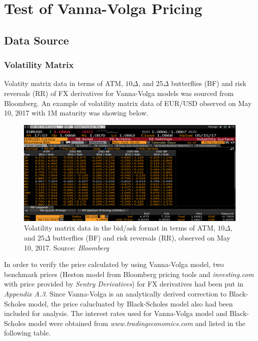 \chapter{Test of Vanna-Volga Pricing}


\section{Data Source}
\subsection{Volatility Matrix}
Volatity matrix data in terms of ATM, $10\Delta$, and 25$\Delta$ butterflies (BF) and risk reversals (RR) of FX derivatives for Vanna-Volga models was sourced from Bloomberg. An example of volatility matrix data of EUR/USD observed on May 10, 2017 with 1M maturity was showing below.

\begin{figure}[htb]
	\centering
	\includegraphics[scale=0.3]{./Testing-data/VolMatrix/EURUSD_1M_vol.png} 
	\caption{Volatility matrix data in the bid/ask format in terms of ATM, $10\Delta$, and $25\Delta$ butterflies (BF) and risk reversals (RR), observed on May 10, 2017. Source: \textit{Bloomberg}}
	\label{fig:label} %
\end{figure}
\noindent
In order to verify the price calculated by using Vanna-Volga model, two benchmark prices (Heston model from Bloomberg pricing tools and \textit{investing.com} with price provided by \textit{Sentry Derivatives}) for FX derivatives had been put in \textit{Appendix A.3}. Since Vanna-Volga is an analytically derived correction to Black-Scholes model, the price calucluated by Black-Scholes model also had been included for analysis.
\newline
\newline
The interest rates used for Vanna-Volga model and Black-Scholes model were obtained from \textit{www.tradingeconomics.com} and listed in the following table.

